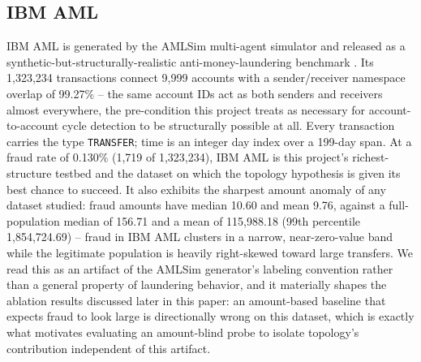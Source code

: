 \begin{table}[t]
\centering
\small
\caption{Graph-topology and scale summary of the four real datasets
computationally profiled in this study (source:
\texttt{calibration\_reference.json}). Amounts are in each dataset's
native units and are not comparable across datasets.}
\label{tab:datasets}
\end{table}

\subsection{IBM AML}

IBM AML is generated by the AMLSim multi-agent simulator and released as a
synthetic-but-structurally-realistic anti-money-laundering benchmark
\cite{altman2023realistic}. Its 1{,}323{,}234 transactions connect 9{,}999
accounts with a sender/receiver namespace overlap of 99.27\% -- the same
account IDs act as both senders and receivers almost everywhere, the
pre-condition this project treats as necessary for account-to-account
cycle detection to be structurally possible at all. Every transaction
carries the type \texttt{TRANSFER}; time is an integer day index over a
199-day span. At a fraud rate of 0.130\% (1{,}719 of 1{,}323{,}234), IBM
AML is this project's richest-structure testbed and the dataset on which
the topology hypothesis is given its best chance to succeed. It also
exhibits the sharpest amount anomaly of any dataset studied: fraud amounts
have median 10.60 and mean 9.76, against a full-population median of
156.71 and a mean of 115{,}988.18 (99th percentile 1{,}854{,}724.69) --
fraud in IBM AML clusters in a narrow, near-zero-value band while the
legitimate population is heavily right-skewed toward large transfers. We
read this as an artifact of the AMLSim generator's labeling convention
rather than a general property of laundering behavior, and it materially
shapes the ablation results discussed later in this paper: an
amount-based baseline that expects fraud to look large is directionally
wrong on this dataset, which is exactly what motivates evaluating an
amount-blind probe to isolate topology's contribution independent of this
artifact.

